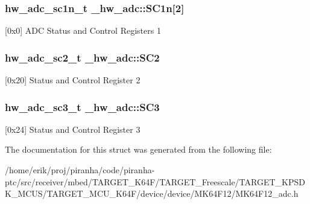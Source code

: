 \subsubsection[{\texorpdfstring{S\+C1n}{SC1n}}]{ {\bf hw\+\_\+adc\+\_\+sc1n\+\_\+t} \+\_\+hw\+\_\+adc\+::\+S\+C1n\mbox{[}2\mbox{]}}\hypertarget{struct__hw__adc_a53ed1272b44a1a74bb07fa80a5a1f7d2}{}\label{struct__hw__adc_a53ed1272b44a1a74bb07fa80a5a1f7d2}
\mbox{[}0x0\mbox{]} A\+DC Status and Control Registers 1 
\subsubsection[{\texorpdfstring{S\+C2}{SC2}}]{ {\bf hw\+\_\+adc\+\_\+sc2\+\_\+t} \+\_\+hw\+\_\+adc\+::\+S\+C2}\hypertarget{struct__hw__adc_a1defe1c9e0a5b5d3d5a9791c58d1dde7}{}\label{struct__hw__adc_a1defe1c9e0a5b5d3d5a9791c58d1dde7}
\mbox{[}0x20\mbox{]} Status and Control Register 2 
\subsubsection[{\texorpdfstring{S\+C3}{SC3}}]{ {\bf hw\+\_\+adc\+\_\+sc3\+\_\+t} \+\_\+hw\+\_\+adc\+::\+S\+C3}\hypertarget{struct__hw__adc_a86cbb0cb0d04dd07f06b98f8624c7bfd}{}\label{struct__hw__adc_a86cbb0cb0d04dd07f06b98f8624c7bfd}
\mbox{[}0x24\mbox{]} Status and Control Register 3 

The documentation for this struct was generated from the following file\+:\begin{DoxyCompactItemize}
\item 
/home/erik/proj/piranha/code/piranha-\/ptc/src/receiver/mbed/\+T\+A\+R\+G\+E\+T\+\_\+\+K64\+F/\+T\+A\+R\+G\+E\+T\+\_\+\+Freescale/\+T\+A\+R\+G\+E\+T\+\_\+\+K\+P\+S\+D\+K\+\_\+\+M\+C\+U\+S/\+T\+A\+R\+G\+E\+T\+\_\+\+M\+C\+U\+\_\+\+K64\+F/device/device/\+M\+K64\+F12/M\+K64\+F12\+\_\+adc.\+h\end{DoxyCompactItemize}
